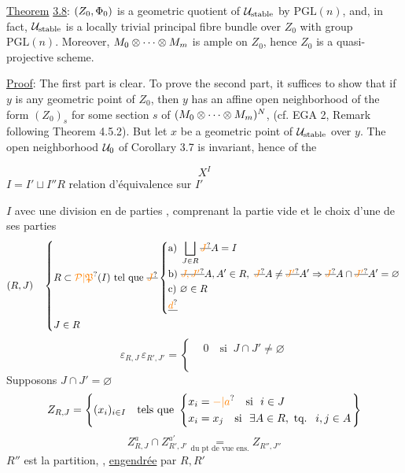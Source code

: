 \uline{Theorem} \uline{3.8}: $(Z_0,\Phi_0)$ is a geometric quotient of $\mathcal{U}_{\mathrm{stable}}$ by
$\mathrm{PGL}(n)$, and, in fact, $\mathcal{U}_{\mathrm{stable}}$ is a locally trivial principal
fibre bundle over $Z_0$ with group $\mathrm{PGL}(n)$. Moreover, $M_0\otimes\cdots\otimes M_m$
is ample on $Z_0$, hence $Z_0$ is a quasi-projective scheme.

\uline{Proof}: The first part is clear. To prove the second part, it
suffices to show that if $y$ is any geometric point of $Z_0$, then $y$
has an affine open neighborhood of the form $(Z_0)_s$ for some section
$s$ of $(M_0\otimes\cdots\otimes M_m)^N$, (cf. EGA 2, Remark following Theorem 4.5.2).
But let $x$ be a geometric point of $\mathcal{U}_{\mathrm{stable}}$ over $y$. The open
neighborhood $\mathcal{U}_0$ of Corollary 3.7 is invariant, hence of the

\[
 X^I
\]
$I=I'\sqcup I''$\qquad $R$ relation d'équivalence sur $I'$

$I$ avec une division en  de parties , comprenant la partie vide
et le choix d'une de ses parties
\[
 (R,J)\quad
 \left\{\begin{aligned}
 &R\subset\unsure{\mathcal P|\mathfrak P}(I)\text{ tel que }\deleted{\unsure{J}}
 \left\{\begin{aligned}
 &\text{a) }\bigsqcup_{J\in R}\deleted{\unsure{J}}A=I\\
 &\text{b) }\deleted{\unsure{J,J'}}A,A'\in R,\ \deleted{\unsure{J}}A\ne\deleted{\unsure{J'}}A'\Rightarrow
 \deleted{\unsure{J}}A\cap\deleted{\unsure{J'}}A'=\varnothing\\
 &\text{c) }\varnothing\in R\\
 &\deleted{\unsure{d}}
 \end{aligned}\right.\\
 &J\in R
 \end{aligned}\right.
\]
\[
 \varepsilon_{R,J}\,\varepsilon_{R',J'}=
 \left\{\begin{aligned}&0\quad\text{si }\ J\cap J'\ne\varnothing\\&\phantom{0}\end{aligned}\right.
\]
 Supposons \qquad $J\cap J'=\varnothing$
\[
 Z_{R,J}=\left\{(x_i)_{i\in I}\quad\text{tels que }\left\{\begin{aligned}
 &x_i=\unsure{-|a}\quad\text{si }\ i\in J\\
 &x_i=x_j\quad\text{si }\ \exists A\in R,\ \text{tq. }\ i,j\in A
 \end{aligned}\right.\right\}
\]
\[
 Z_{R,J}^{a}\cap Z_{R',J'}^{a'}\underset{\text{du pt de vue ens.}}{=}Z_{R'',J''}
\]
$R''$ est la partition, ,
\uline{engendrée} par $R,R'$

